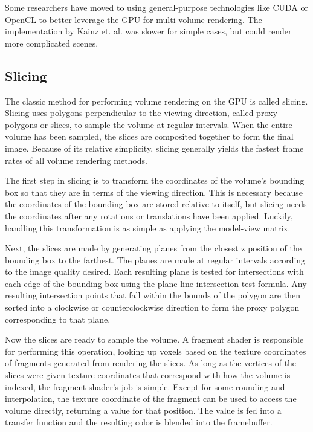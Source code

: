 \documentclass{article}
\begin{document}
Some researchers have moved to using general-purpose technologies like CUDA or
OpenCL to better leverage the GPU for multi-volume rendering.  The
implementation by Kainz et. al. \cite{Kainz09} was slower for simple cases, but could
render more complicated scenes.

\subsection{Slicing}

The classic method for performing volume rendering on the GPU is called slicing.
Slicing uses polygons perpendicular to the viewing direction, called proxy
polygons or slices, to sample the volume at regular intervals.  When the entire
volume has been sampled, the slices are composited together to form the final
image.  Because of its relative simplicity, slicing generally yields the fastest
frame rates of all volume rendering methods.

The first step in slicing is to transform the coordinates of the volume’s
bounding box so that they are in terms of the viewing direction.  This is
necessary because the coordinates of the bounding box are stored relative to
itself, but slicing needs the coordinates after any rotations or translations
have been applied.  Luckily, handling this transformation is as simple as
applying the model-view matrix.

Next, the slices are made by generating planes from the closest z position of
the bounding box to the farthest.  The planes are made at regular intervals
according to the image quality desired.  Each resulting plane is tested for
intersections with each edge of the bounding box using the plane-line
intersection test formula.  Any resulting intersection points that fall within
the bounds of the polygon are then sorted into a clockwise or counterclockwise
direction to form the proxy polygon corresponding to that plane.

Now the slices are ready to sample the volume.  A fragment shader is responsible
for performing this operation, looking up voxels based on the texture
coordinates of fragments generated from rendering the slices.  As long as the
vertices of the slices were given texture coordinates that correspond with how
the volume is indexed, the fragment shader’s job is simple.  Except for some
rounding and interpolation, the texture coordinate of the fragment can be used
to access the volume directly, returning a value for that position.  The value
is fed into a transfer function and the resulting color is blended into the
framebuffer.
\end{document}
